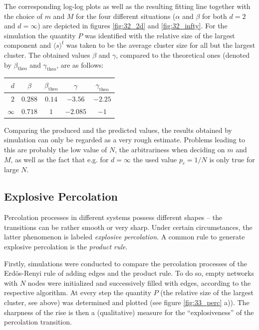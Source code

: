 \documentclass{scrartcl}
\begin{document}
The corresponding log-log plots as well as the resulting fitting line
together with the choice of $m$ and $M$ for the four different situations
($\alpha$ and $\beta$ for both $d=2$ and $d=\infty$) are depicted in
figures \ref{fig:32_2d} and \ref{fig:32_infty}. For the simulation the
quantity $P$ was identified with the relative size of the largest component
and $\langle s\rangle^\mathrm{f}$ was taken to be the average cluster size
for all but the largest cluster. The obtained values $\beta$ and $\gamma$,
compared to the theoretical ones (denoted by $\beta_\mathrm{theo}$ and
$\gamma_\mathrm{theo}$, are as follows:

\begin{center}
    \begin{tabular}{r@{\qquad\qquad}c@{\quad}c@{\qquad\quad}c@{\quad}c}
    $d$ & $\beta$ & $\beta_\mathrm{theo}$ & $\gamma$ & $\gamma_\mathrm{theo}$ \\
    \hline
    $2$ & $0.288$ & $0.14$ & $-3.56$ & $-2.25$   \\
    $\infty$ & $0.718$ & $1$ & $-2.085$ & $-1$ \\
\end{tabular}
\end{center}

Comparing the produced and the predicted values, the results obtained
by simulation can only be regarded as a very rough estimate. Problems
leading to this are probably the low value of $N$, the arbitrariness when
deciding on $m$ and $M$, as well as the fact that e.g. for $d=\infty$ the used
value $p_c=1/N$ is only true for large $N$.


\subsection{Explosive Percolation}
Percolation processes in different systems possess different shapes -- the
transitions can be rather smooth or very sharp. Under certain
circumstances, the latter phenomenon is labeled \emph{explosive
percolation}. A common rule to generate explosive percolation
is the \emph{product rule}.

 Firstly, simulations were conducted to compare the
percolation processes of the Erdös-Renyi rule of adding edges and the
product rule. To do so, empty networks with $N$ nodes were initialized and
successively filled with edges, according to the respective algorithm. At
every step the quantity $P$ (the relative size of the largest cluster, see
above) was determined and plotted (see figure \ref{fig:33_perc} a)). The
sharpness of the rise is then a (qualitative) measure for the
\enquote{explosiveness} of the percolation transition.
\end{document}
